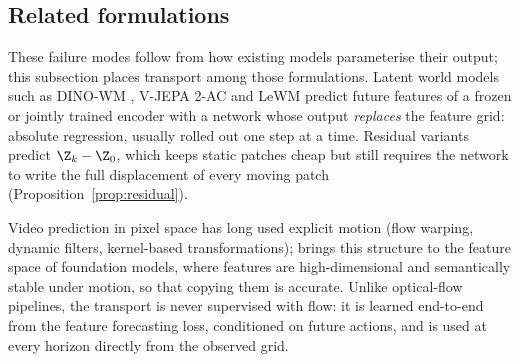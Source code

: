 \FloatBarrier
\subsection{Related formulations}\label{app:related-formulations}
These failure modes follow from how existing models parameterise their output; this subsection places transport among
those formulations.
Latent world models such as DINO-WM \citep{zhou2025dinowm}, V-JEPA 2-AC \citep{assran2025vjepa2} and LeWM
\citep{maes2026lewm} predict future features of a frozen or jointly trained encoder with a network whose output
\emph{replaces} the feature grid: absolute regression, usually rolled out one step at a time. Residual variants predict
$\Z_k-\Z_0$, which keeps static patches cheap but still requires the network to write the full displacement of
every moving patch (Proposition~\ref{prop:residual}).

Video prediction in pixel space has long used explicit motion
(flow warping, dynamic filters, kernel-based transformations); \ours{} brings this structure to the feature space of
foundation models, where features are high-dimensional and semantically stable under motion, so that copying them is
accurate. Unlike optical-flow pipelines, the transport is never supervised with flow: it is learned end-to-end from the
feature forecasting loss, conditioned on future actions, and is used at every horizon directly from the observed grid.
